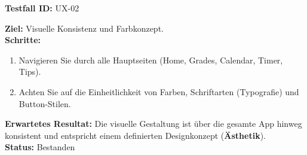 \documentclass[11pt, a4paper]{article}
\newenvironment{testcase}[1]{%
    \par\vspace{1em}\noindent\begin{minipage}{\linewidth}
    \textbf{Testfall ID:} #1 \\
    \vspace{0.2em}
}{\end{minipage}\par\vspace{1em}}
\begin{document}
\begin{testcase}{UX-02}
    \textbf{Ziel:} Visuelle Konsistenz und Farbkonzept.\\
    \textbf{Schritte:}
    \begin{enumerate}[label=\arabic*.]
        \item Navigieren Sie durch alle Hauptseiten (Home, Grades, Calendar, Timer, Tips).
        \item Achten Sie auf die Einheitlichkeit von Farben, Schriftarten (Typografie) und Button-Stilen.
    \end{enumerate}
    \textbf{Erwartetes Resultat:} Die visuelle Gestaltung ist über die gesamte App hinweg konsistent und entspricht einem definierten Designkonzept (\textbf{Ästhetik}).\\
    \vspace{0.5em}\textbf{Status:} \textcolor{passcolor}{Bestanden}
\end{testcase}
\end{document}
